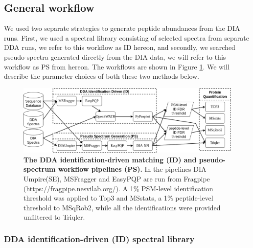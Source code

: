 \documentclass[10pt,letterpaper]{article}
\begin{document}
\subsection*{General workflow}

We used two separate strategies to generate peptide abundances from the DIA runs. First, we used a spectral library consisting of selected spectra from separate DDA runs, we refer to this workflow as ID hereon, and secondly, we searched pseudo-spectra generated directly from the DIA data, we will refer to this workflow as PS from hereon. The workflows are shown in Figure \ref{fig:flowchart}. We will describe the parameter choices of both these two methods below.

\begin{figure}[htp]
    \centering
    \includegraphics[width=1.0\linewidth]{./img/methods.png} 
    \caption{{\bf The DDA identification-driven matching (ID) and pseudo-spectrum workflow pipelines (PS).} In the pipelines DIA-Umpire(SE), MSFragger and EasyPQP are run from Fragpipe (\protect\url{https://fragpipe.nesvilab.org/}). A 1\% PSM-level identification threshold was applied to Top3 and MSstats, a 1\% peptide-level threshold to MSqRob2, while all the identifications were provided unfiltered to Triqler. \label{fig:flowchart}}  
\end{figure}



\subsubsection*{DDA identification-driven (ID) spectral library}
\end{document}
